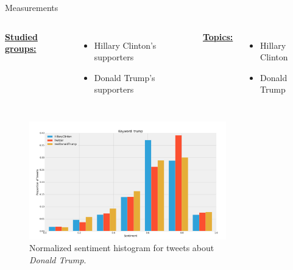 \documentclass{beamer}
\begin{document}
\begin{frame}[fragile]
\begin{columns}[T]
\begin{column}{.63\textwidth}
\begin{block}{Measurements}
    \begin{columns}
            \underline{\textbf{Studied groups:}}
            \vspace{1cm}
            \begin{itemize}
                \item Hillary Clinton's supporters
                \item Donald Trump's supporters
            \end{itemize}
            \underline{\textbf{Topics:}}
            \vspace{1cm}
            \begin{itemize}
                \item Hillary Clinton
                \item Donald Trump
            \end{itemize}
    \end{columns}
    \begin{columns}
            \begin{figure}
                \centering
                \captionsetup{justification=centering,margin=2cm}
                \includegraphics[scale=0.5]{./Pics/hist-trump.png}
                \caption*{Normalized sentiment histogram for tweets about \textit{Donald Trump}.}
            \end{figure}
            \begin{figure}
                \centering
                \captionsetup{justification=centering,margin=2cm}

\end{figure}
\end{columns}
\end{block}
\end{column}
\end{columns}
\end{frame}
\end{document}
